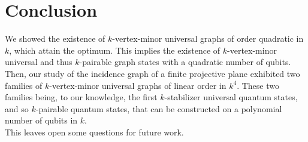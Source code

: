 \documentclass[a4paper,UKenglish,cleveref, autoref, thm-restate]{arxiv}
\begin{document}
\section{Conclusion}

We showed the existence of $k$-vertex-minor universal graphs of order quadratic in $k$, which attain the optimum. This implies the existence of $k$-vertex-minor universal and thus $k$-pairable graph states with a quadratic number of qubits. Then, our study of the incidence graph of a finite projective plane exhibited two families of $k$-vertex-minor universal graphs of linear order in $k^4$. These two families being, to our knowledge, the first $k$-stabilizer universal quantum states, and so $k$-pairable quantum states, that can be constructed on a polynomial number of qubits in $k$.\\
This leaves open some questions for future work.
\end{document}
